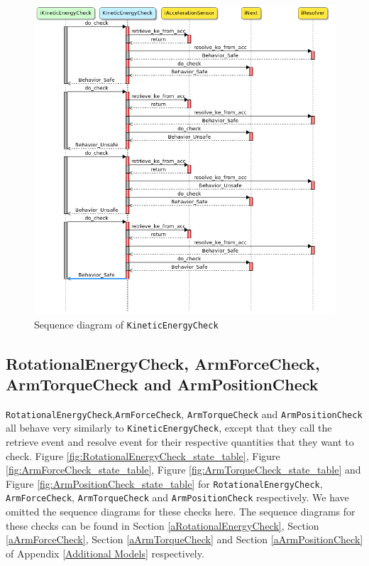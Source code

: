 \documentclass[12pt]{scrreprt}
\begin{document}
\begin{figure}[H]
    \centering
    \includegraphics[width=\textwidth]{Figures/results/modelling_figures/KineticEnergyCheck/KineticEnergyCheck_seq.png}
    \caption{Sequence diagram of \texttt{KineticEnergyCheck}}
    \label{fig:kineticenergycheck_seq}
\end{figure}

\subsection{RotationalEnergyCheck, ArmForceCheck, ArmTorqueCheck and ArmPositionCheck}
\texttt{RotationalEnergyCheck},\texttt{ArmForceCheck}, \texttt{ArmTorqueCheck} and \texttt{ArmPositionCheck} all behave very similarly to \texttt{KineticEnergyCheck}, except that they call the retrieve event and resolve event for their respective quantities that they want to check. Figure \ref{fig:RotationalEnergyCheck_state_table}, Figure \ref{fig:ArmForceCheck_state_table}, Figure \ref{fig:ArmTorqueCheck_state_table} and Figure \ref{fig:ArmPositionCheck_state_table} for \texttt{RotationalEnergyCheck}, \\\texttt{ArmForceCheck}, \texttt{ArmTorqueCheck} and \texttt{ArmPositionCheck} respectively. We have omitted the sequence diagrams for these checks here. The sequence diagrams for these checks can be found in Section \ref{aRotationalEnergyCheck}, Section \ref{aArmForceCheck}, Section \ref{aArmTorqueCheck} and Section \ref{aArmPositionCheck} of Appendix \ref{Additional Models} respectively.
\end{document}
